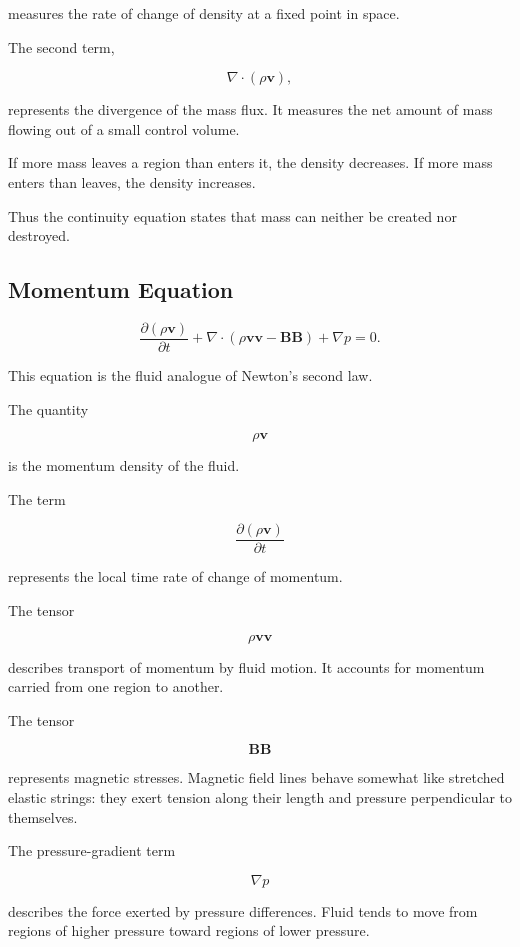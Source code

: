 \documentclass[12pt]{article}
\begin{document}
measures the rate of change of density at a fixed point in space.

The second term,

\[
\nabla\cdot(\rho\mathbf{v}),
\]

represents the divergence of the mass flux.
It measures the net amount of mass flowing out of a small control volume.

If more mass leaves a region than enters it, the density decreases.
If more mass enters than leaves, the density increases.

Thus the continuity equation states that mass can neither be created nor destroyed.

\subsection{Momentum Equation}

\begin{equation}
\frac{\partial (\rho\mathbf{v})}{\partial t}
+
\nabla\cdot
\left(
\rho\mathbf{v}\mathbf{v}
-
\mathbf{B}\mathbf{B}
\right)
+
\nabla p
=
0.
\end{equation}

This equation is the fluid analogue of Newton's second law.

The quantity

\[
\rho\mathbf{v}
\]

is the momentum density of the fluid.

The term

\[
\frac{\partial(\rho\mathbf{v})}{\partial t}
\]

represents the local time rate of change of momentum.

The tensor

\[
\rho\mathbf{v}\mathbf{v}
\]

describes transport of momentum by fluid motion.
It accounts for momentum carried from one region to another.

The tensor

\[
\mathbf{B}\mathbf{B}
\]

represents magnetic stresses.
Magnetic field lines behave somewhat like stretched elastic strings:
they exert tension along their length and pressure perpendicular to themselves.

The pressure-gradient term

\[
\nabla p
\]

describes the force exerted by pressure differences.
Fluid tends to move from regions of higher pressure toward regions of lower pressure.
\end{document}
